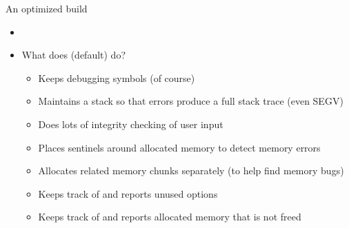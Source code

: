 % 

\begin{frame}{An optimized build}
  \begin{itemize}
  \item {}
  \item What does  (default) do?
    \begin{itemize}
    \item Keeps debugging symbols (of course)
    \item Maintains a stack so that errors produce a full stack trace (even SEGV)
    \item Does lots of integrity checking of user input
    \item Places sentinels around allocated memory to detect memory errors
    \item Allocates related memory chunks separately (to help find memory bugs)
    \item Keeps track of and reports unused options
    \item Keeps track of and reports allocated memory that is not freed \\
      \quad {}
    \end{itemize}
  \end{itemize}
\end{frame}
